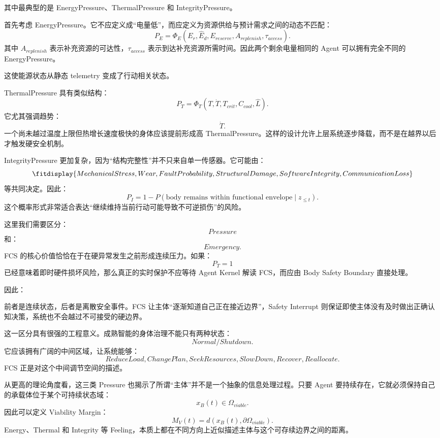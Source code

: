 其中最典型的是 EnergyPressure、ThermalPressure 和 IntegrityPressure。

首先考虑 EnergyPressure。它不应定义成“电量低”，而应定义为资源供给与预计需求之间的动态不匹配：
\[
P_E
=
\Phi_E
(
E_r,
\hat E_d,
E_{reserve},
A_{replenish},
\tau_{access}
).
\]
其中 $A_{replenish}$ 表示补充资源的可达性，$\tau_{access}$ 表示到达补充资源所需时间。因此两个剩余电量相同的 Agent 可以拥有完全不同的 EnergyPressure。

这使能源状态从静态 telemetry 变成了行动相关状态。

ThermalPressure 具有类似结构：
\[
P_T
=
\Phi_T
(
T,
\dot T,
T_{crit},
C_{cool},
\hat L
).
\]
它尤其强调趋势：
\[
\dot T.
\]
一个尚未越过温度上限但热增长速度极快的身体应该提前形成高 ThermalPressure。这样的设计允许上层系统逐步降载，而不是在越界以后才触发硬安全机制。

IntegrityPressure 更加复杂，因为“结构完整性”并不只来自单一传感器。它可能由：
\[
\fitdisplay{
MechanicalStress,
Wear,
FaultProbability,
StructuralDamage,
SoftwareIntegrity,
CommunicationLoss
}
\]
等共同决定。因此：
\[
P_I
=
1-
P(
\text{body remains within functional envelope}
\mid
z_{\le t}
).
\]
这个概率形式非常适合表达“继续维持当前行动可能导致不可逆损伤”的风险。

这里我们需要区分：
\[
Pressure
\]
和：
\[
Emergency.
\]
FCS 的核心价值恰恰在于在硬异常发生之前形成连续压力。如果：
\[
P_T=1
\]
已经意味着即时硬件损坏风险，那么真正的实时保护不应等待 Agent Kernel 解读 FCS，而应由 Body Safety Boundary 直接处理。

因此：
\begin{statementbox}
\centering
{}
\end{statementbox}
前者是连续状态，后者是离散安全事件。FCS 让主体“逐渐知道自己正在接近边界”，Safety Interrupt 则保证即使主体没有及时做出正确认知决策，系统也不会越过不可接受的硬边界。

这一区分具有很强的工程意义。成熟智能的身体治理不能只有两种状态：
\[
Normal/Shutdown.
\]
它应该拥有广阔的中间区域，让系统能够：
\[
ReduceLoad,
ChangePlan,
SeekResources,
SlowDown,
Recover,
Reallocate.
\]
FCS 正是对这个中间调节空间的描述。

从更高的理论角度看，这三类 Pressure 也揭示了所谓“主体”并不是一个抽象的信息处理过程。只要 Agent 要持续存在，它就必须保持自己的承载体位于某个可持续状态域：
\[
x_B(t)\in\Omega_{viable}.
\]
因此可以定义 Viability Margin：
\[
M_V(t)
=
d
(
x_B(t),
\partial\Omega_{viable}
).
\]
Energy、Thermal 和 Integrity 等 Feeling，本质上都在不同方向上近似描述主体与这个可存续边界之间的距离。

